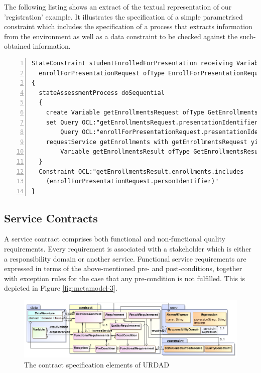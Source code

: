 The following listing shows an extract of the textual representation of our 'registration' example. It illustrates the specification of a simple parametrised constraint which includes the specification of a process that extracts information from the environment as well as a data constraint to be checked against the such-obtained information.
\tiny \begin{lstlisting}[numbers=left,escapechar=|]
StateConstraint studentEnrolledForPresentation receiving Variable 
  enrollForPresentationRequest ofType EnrollForPresentationRequest
{
  stateAssessmentProcess doSequential
  {
    create Variable getEnrollmentsRequest ofType GetEnrollmentsRequest
    set Query OCL:"getEnrollmentsRequest.presentationIdentifier" equalTo
        Query OCL:"enrollForPresentationRequest.presentationIdentifier"
    requestService getEnrollments with getEnrollmentsRequest yielding
        Variable getEnrollmentsResult ofType GetEnrollmentsResult
  }
  Constraint OCL:"getEnrollmentsResult.enrollments.includes
    (enrollForPresentationRequest.personIdentifier)"
}
\end{lstlisting}\normalsize
\lstset{caption=My Caption,label=my_label}


\subsection{Service Contracts}

A service contract comprises both functional and non-functional quality requirements. Every requirement is associated with a stakeholder which is either a responsibility domain or another service. Functional service requirements are expressed in terms of the above-mentioned pre- and post-conditions, together with exception rules for the case that any pre-condition is not fulfilled. This is depicted in Figure \ref{fig:metamodel-3}.
\begin{figure}[Htbp]
  \centering
  \includegraphics{contract}
  \caption{The contract specification elements of URDAD}
  \label{fig:contractModule}
\end{figure}

